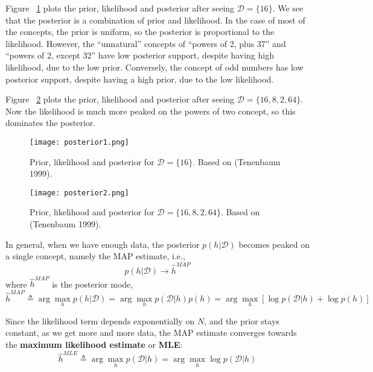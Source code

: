 Figure ~\ref{fig:posterior1} plots the prior, likelihood and posterior after seeing $\mathcal{D}=\{16\}$. We see that the posterior is a combination of prior and likelihood. In the case of most of the concepts, the prior is uniform, so the posterior is proportional to the likelihood. However, the “unnatural” concepts of “powers of 2, plus 37” and “powers of 2, except 32” have low posterior support, despite having high likelihood, due to the low prior. Conversely, the concept of odd numbers has low posterior support, despite having a high prior, due to the low likelihood.

Figure ~\ref{fig:posterior2} plots the prior, likelihood and posterior after seeing $\mathcal{D}=\{16,8,2,64\}$. Now the likelihood is much more peaked on the powers of two concept, so this dominates the posterior.

\begin{figure}[hbtp]
\centering
    \texttt{[image: posterior1.png]}
\caption{Prior, likelihood and posterior for $\mathcal{D}=\{16\}$. Based on (Tenenbaum 1999).}
\label{fig:posterior1} 
\end{figure}

\begin{figure}[hbtp]
\centering
    \texttt{[image: posterior2.png]}
\caption{Prior, likelihood and posterior for $\mathcal{D}=\{16,8,2,64\}$. Based on (Tenenbaum 1999).}
\label{fig:posterior2} 
\end{figure}

In general, when we have enough data, the posterior $p(h|\mathcal{D})$ becomes peaked on a single concept, namely the MAP estimate, i.e.,
\begin{equation}
p(h|\mathcal{D}) \rightarrow \hat{h}^{MAP}
\end{equation}
where $\hat{h}^{MAP}$ is the posterior mode,
\begin{equation}
\hat{h}^{MAP} \triangleq \arg\max\limits_h p(h|\mathcal{D})=\arg\max\limits_h p(\mathcal{D}|h)p(h)=\arg\max\limits_h [\log p(\mathcal{D}|h) + \log p(h)]
\end{equation}

Since the likelihood term depends exponentially on $N$, and the prior stays constant, as we get more and more data, the MAP estimate converges towards the \textbf{maximum likelihood estimate} or \textbf{MLE}:
\begin{equation}
\hat{h}^{MLE} \triangleq \arg\max\limits_h p(\mathcal{D}|h)=\arg\max\limits_h \log p(\mathcal{D}|h)
\end{equation}

